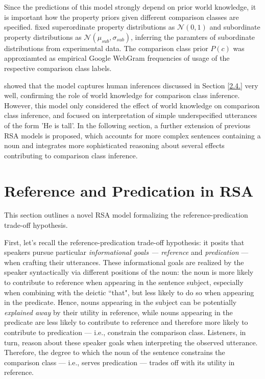 Since the predictions of this model strongly depend on prior world knowledge, it is important how the property priors given different comparison classes are specified. \textcite{tessler2017warm} fixed superordinate property distributions as $\mathcal{N} (0, 1)$ and subordinate property distributions as $\mathcal{N}(\mu_{sub}, \sigma_{sub})$, inferring the paramters of subordinate distributions from experimental data. The comparison class prior $P(c)$ was approxiamted as empirical Google WebGram frequencies of usage of the respective comparison class labels. 

\textcite{tessler2017warm} showed that the model captures human inferences discussed in Section \ref{2.4.} very well, confirming the role of world knowledge for comparison class inference. 
However, this model only considered the effect of world knowledge on comparison class inference, and focused on interpretation of simple underspecified utterances of the form 'He is tall'. In the following section, a further extension of previous RSA models is proposed, which accounts for more complex sentences containing a noun and integrates more sophisticated reasoning about several effects contributing to comparison class inference.  

\section{Reference and Predication in RSA}
This section outlines a novel RSA model formalizing the reference-predication trade-off hypothesis.

First, let's recall the reference-predication trade-off hypothesis: it posits that speakers pursue particular \emph{informational goals --- reference} and \emph{predication} --- when crafting their utterances. These informational goals are realized by the speaker syntactically via different positions of the noun: the noun is more likely to contribute to reference when appearing in the sentence subject, especially when combining with the deictic ``that", but less likely to do so when appearing in the predicate. Hence, nouns appearing in the subject can be potentially \emph{explained away} by their utility in reference, while nouns appearing in the predicate  are less likely to contribute to reference and therefore more likely to contribute to predication --- i.e., constrain the comparison class. Listeners, in turn, reason about these speaker goals when interpreting the observed utterance.  
Therefore, the degree to which the noun of the sentence constrains the comparison class --- i.e., serves predication --- trades off with its utility in reference. 

